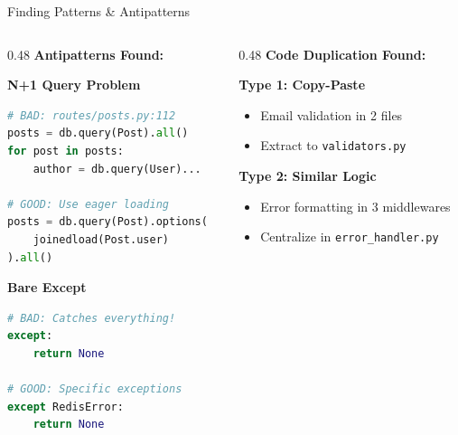 \documentclass[aspectratio=169,11pt]{beamer}
\begin{document}
\begin{frame}[fragile]{Finding Patterns \& Antipatterns}
    \begin{columns}[T]
        \begin{column}{0.48\textwidth}
            \textbf{Antipatterns Found:}

            \vspace{0.2cm}
            \textcolor{UofSCRose}{\faExclamationTriangle} \textbf{N+1 Query Problem}
            \begin{lstlisting}[language=python, basicstyle=\ttfamily\tiny]
# BAD: routes/posts.py:112
posts = db.query(Post).all()
for post in posts:
    author = db.query(User)...

# GOOD: Use eager loading
posts = db.query(Post).options(
    joinedload(Post.user)
).all()
            \end{lstlisting}

            \vspace{0.2cm}
            \textcolor{UofSCRose}{\faExclamationTriangle} \textbf{Bare Except}
            \begin{lstlisting}[language=python, basicstyle=\ttfamily\tiny]
# BAD: Catches everything!
except:
    return None

# GOOD: Specific exceptions
except RedisError:
    return None
            \end{lstlisting}
        \end{column}
        \begin{column}{0.48\textwidth}
            \textbf{Code Duplication Found:}

            \vspace{0.2cm}
            \textcolor{UofSCHoneycomb}{\faClone} \textbf{Type 1: Copy-Paste}
            \begin{itemize}
                \item Email validation in 2 files
                \item Extract to \texttt{validators.py}
            \end{itemize}

            \vspace{0.2cm}
            \textcolor{UofSCHoneycomb}{\faClone} \textbf{Type 2: Similar Logic}
            \begin{itemize}
                \item Error formatting in 3 middlewares
                \item Centralize in \texttt{error\_handler.py}
            \end{itemize}


\end{column}
\end{columns}
\end{frame}
\end{document}
